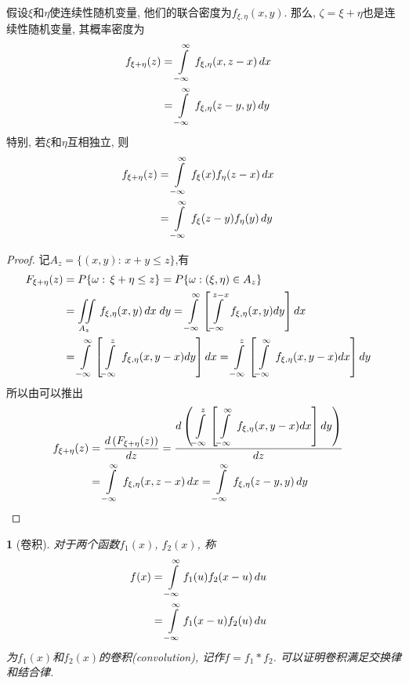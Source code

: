 \begin{addtion_of_two_random_var}[随机变量和的分布]
    \label{lem:rva}
    假设\(\xi\)和\(\eta\)使连续性随机变量, 他们的联合密度为\(f_{\xi,\eta}(x, y)\).
    那么, \(\zeta = \xi + \eta\)也是连续性随机变量, 其概率密度为
    \begin{align}
        f_{\xi + \eta}(z) &= \int\limits_{-\infty}^{\infty}\,f_{\xi, \eta}(x, z-x)\,dx\cr
        &= \int\limits_{-\infty}^{\infty}\,f_{\xi, \eta}(z-y, y)\,dy
    \end{align}
    特别, 若\(\xi\)和\(\eta\)互相独立, 则
    \begin{align}
        f_{\xi + \eta}(z) &= \int\limits_{-\infty}^{\infty}\,f_{\xi}(x)f_{\eta}(z-x)\,dx\cr
        &= \int\limits_{-\infty}^{\infty}\,f_{\xi}(z-y)f_{\eta}(y)\,dy
    \end{align}
    \begin{proof}
    记\(A_z = \{(x, y):\,x+y\le z\}\),有
    \begin{align}
        \label{equ:rvb}
        F_{\xi+\eta}(z) &= P\{\omega:\,\xi+\eta\le z\}
        = P\{\omega:(\xi, \eta)\in A_z\}\cr
        &= \iint\limits_{A_z}\,f_{\xi, \eta}(x, y)\,dx\;dy
        = \int\limits_{-\infty}^{\infty}\left[\int\limits_{-\infty}^{z-x}\,f_{\xi, \eta}(x, y)dy\right]dx\cr
        &= \int\limits_{-\infty}^{\infty}\left[\int\limits_{-\infty}^{z}\,f_{\xi, \eta}(x, y-x)dy\right]dx
        = \int\limits_{-\infty}^{z}\left[\int\limits_{-\infty}^{\infty}\,f_{\xi, \eta}(x, y-x)dx\right]dy
    \end{align}
    所以由可以推出
    \begin{align}
        f_{\xi+\eta}(z) &= {d\left(F_{\xi+\eta}(z)\right)\over dz}
        ={\displaystyle d\left(\int\limits_{-\infty}^{z}\left[\int\limits_{-\infty}^{\infty}\,f_{\xi, \eta}(x, y-x)dx\right]dy\right)\over dz}\cr
        &= \int\limits_{-\infty}^{\infty}\,f_{\xi, \eta}(x, z-x)\,dx
        = \int\limits_{-\infty}^{\infty}\,f_{\xi, \eta}(z-y, y)\,dy
    \end{align}
    \end{proof}
\end{addtion_of_two_random_var}

\newtheorem*{convolution_def}{}
\begin{convolution_def}[卷积]
    对于两个函数\(f_1(x)\), \(f_2(x)\), 称
    \begin{align}
        f(x) &= \int\limits_{-\infty}^{\infty}f_1(u)f_2(x-u)\,du\cr
        &= \int\limits_{-\infty}^{\infty}f_1(x-u)f_2(u)\,du
    \end{align}
    为\(f_1(x)\)和\(f_2(x)\)的卷积(convolution), 记作\(f = f_1\ast f_2\).
    可以证明卷积满足交换律和结合律.
\end{convolution_def}

